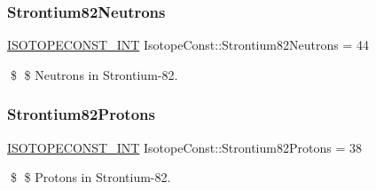 \subsubsection{\texorpdfstring{Strontium82\+Neutrons}{Strontium82Neutrons}}
{\footnotesize\ttfamily \mbox{\hyperlink{group___isotope_const-_macros_ga5f18360b3e99483a35c32d789e62621c}{I\+S\+O\+T\+O\+P\+E\+C\+O\+N\+S\+T\+\_\+\+I\+NT}} Isotope\+Const\+::\+Strontium82\+Neutrons = 44}

\$ \$ Neutrons in Strontium-\/82. \mbox{\label{group___isotope_const-_strontium-_sr82_ga7e57ae59fc9f8a143c73696786af2d66}} 
\subsubsection{\texorpdfstring{Strontium82\+Protons}{Strontium82Protons}}
{\footnotesize\ttfamily \mbox{\hyperlink{group___isotope_const-_macros_ga5f18360b3e99483a35c32d789e62621c}{I\+S\+O\+T\+O\+P\+E\+C\+O\+N\+S\+T\+\_\+\+I\+NT}} Isotope\+Const\+::\+Strontium82\+Protons = 38}

\$ \$ Protons in Strontium-\/82. 